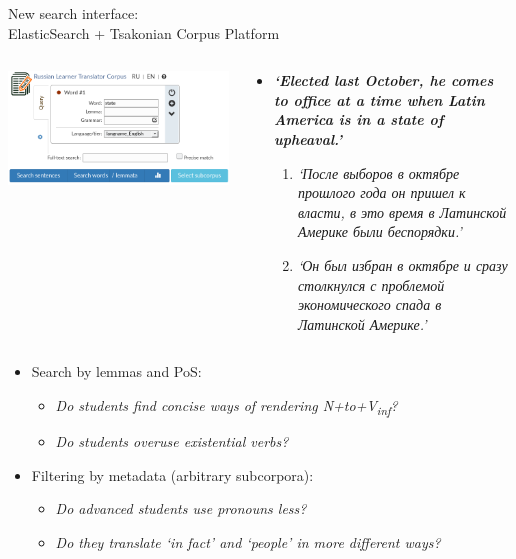 \documentclass{beamer}
\begin{document}
\begin{frame}[fragile]
\begin{columns}[T]
\begin{column}{.55\textwidth}
\begin{block}{New search interface: \\ElasticSearch + Tsakonian Corpus Platform}
\begin{columns}
\begin{column}{0.4\textwidth}
\includegraphics[width=\linewidth,keepaspectratio]{images/rltc_example.png} 
\end{column}
\begin{column}{0.55\textwidth}
\begin{itemize}
\scriptsize
    \item\textbf{ \textit{`Elected last October, he comes to office at a time when Latin America is in a state of upheaval.'}}
    \begin{enumerate}
    \tiny
   \item \textit{`После выборов в октябре прошлого года он пришел к власти, в это время в Латинской Америке были беспорядки.'}
    \item\textit{ `Он был избран в октябре и сразу столкнулся с проблемой экономического спада в Латинской Америке.'}
    \end{enumerate}
\end{itemize}
\end{column}
\end{columns}
\bigskip
	\begin{itemize}
	\small
		\item Search by lemmas and PoS:
		\begin{itemize}
		\footnotesize
			\item \textit{Do students find concise ways of rendering N+to+V\textsubscript{inf}?}
			\item \textit{Do students overuse existential verbs?}
		\end{itemize}
		\item Filtering by metadata (arbitrary subcorpora):
		\begin{itemize}
		\footnotesize
			\item \textit{Do advanced students use pronouns less?}
			\item \textit{Do they translate `in fact' and `people' in more different ways?}
		\end{itemize}
	\end{itemize}



\end{block}
\end{column}
\end{columns}
\end{frame}
\end{document}
